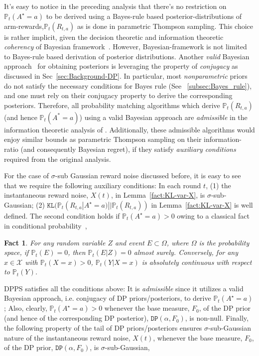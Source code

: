 \documentclass[10pt]{article}
\newtheorem{fact}[thm]{Fact}
\def\KL{\texttt{KL}}
\newcommand{\Prob}{\mathbb{P}}
\newcommand{\DP}{\texttt{DP}}
\begin{document}
It's easy to notice in the preceding analysis that there's no restriction on  $\Prob_{t}(A^\star=a)$ to be derived using a Bayes-rule based posterior-distributions  of arm-rewards,$\Prob_{t}(R_{t,a})$ as is done in parametric Thompson sampling.  This choice is rather implicit, given the decision theoretic and information theoretic \textit{coherency} of {Bayesian framework}~\citep{wald1961statistical,zellner1988optimal}. 
However, Bayesian-framework is not limited to Bayes-rule based derivation of posterior distributions. Another \textit{valid} Bayesian approach~\citep{orbanz2009construction,ghosal2017fundamentals} for obtaining posteriors is leveraging the property of \emph{conjugacy} as discussed in Sec~\ref{sec:Background-DP}.  In particular, most \emph{nonparametric} priors do not satisfy the necessary conditions for Bayes rule (See ~\ref{subsec:Bayes_rule}), and one must rely on their conjugacy property to derive the corresponding posteriors.  Therefore, all probability matching algorithms which derive  $\Prob_{t}(R_{t,a})$ (and hence $\Prob_{t}(A^{*}=a)$) using a valid Bayesian approach are \textit{admissible} in the information theoretic analysis of \cite{russo2014learning}. Additionally, these admissible algorithms would enjoy similar bounds as parametric Thompson sampling on their information-ratio (and consequently Bayesian regret), if they satisfy  \textit{auxiliary conditions} required from the original analysis.

For the case of $\sigma$-sub Gaussian reward noise discussed before, it is easy to see that we require the following auxiliary conditions: In each round $t$, (1) the instantaneous reward noise, $X(t)$, in Lemma~\ref{fact:KL-var-X}, is $\sigma$-sub-Gaussian; (2) $\KL(\Prob_{t}(R_{t,a} | A^\star=a)||\Prob_t(R_{t,a}))$ in Lemma~\ref{fact:KL-var-X} is well defined. The second condition holds if $\Prob_{t}(A^\star=a)>0$ owing to a classical fact in conditional probability~\citep{williams1991probability}, 

\begin{fact}
\label{fact:abs-continuity}
For any random variable $Z$ and event $E \subset \Omega$, where $\Omega$ is the probability space, if $\Prob_{t}(E) = 0$, then $\Prob_{t}(E|Z) = 0$ almost surely. Conversely, for any $x \in \mathcal{X}$ with $\Prob_{t}(X = x) > 0$, $\Prob_{t}(Y|X = x)$ is absolutely continuous with respect to $\Prob_{t}(Y)$.
\end{fact}

DPPS satisfies all the conditions above: It is \textit{admissible} since it utilizes a valid Bayesian approach, i.e. conjugacy of DP priors/posteriors, to derive $\Prob_{t}(A^\star=a)$; Also, clearly,  $\Prob_{t}(A^\star=a) > 0$  whenever the base measure, $F_{0}$, of the DP prior (and hence of the corresponding DP posterior), $\DP(\alpha,F_{0})$, is non-null. Finally, the following property of the tail of DP priors/posteriors ensures $\sigma$-sub-Gaussian nature of the instantaneous reward noise, $X(t)$, whenever the base measure, $F_{0}$, of the DP prior, $\DP(\alpha,F_{0})$, is $\sigma$-sub-Gaussian,
\end{document}
